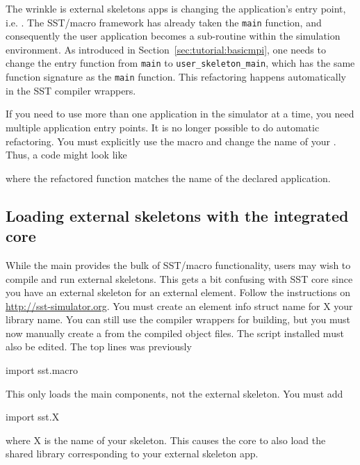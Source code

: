 The wrinkle is external skeletons apps is changing the application's entry point, i.e. .
The SST/macro framework has already taken the \texttt{main} function, and consequently the user application becomes a sub-routine within the simulation environment. As introduced in Section~\ref{sec:tutorial:basicmpi}, one needs to change the entry function from \texttt{main} to \texttt{user\_skeleton\_main}, which has the same function signature as the \texttt{main} function.  This refactoring happens automatically in the SST compiler wrappers. 

If you need to use more than one application in the simulator at a time, you need multiple application entry points.
It is no longer possible to do automatic refactoring.  You must explicitly use the macro 
and change the name of your .  Thus, a code might look like

\begin{CppCode}
sstmac_register_app(my_app);

int my_app_main(int argc, char** argv)
{
...
\end{CppCode}
where the refactored  function matches the name of the declared application.

\subsection{Loading external skeletons with the integrated core}\label{subsec:linkageCore}
While the main  provides the bulk of SST/macro functionality, 
users may wish to compile and run external skeletons.  This gets a bit confusing with SST core since you have an external skeleton for an external element.  Follow the instructions on \url{http://sst-simulator.org}. You must create an element info struct name  for X your library name.  You can still use the  compiler wrappers for building, but you must now manually create a  from the compiled object files.  The  script installed must also be edited.  The top lines was previously

\begin{ViFile}
import sst.macro
\end{ViFile}
This only loads the main components, not the external skeleton. You must add

\begin{ViFile}
import sst.X
\end{ViFile}
where X is the name of your skeleton. This causes the core to also load the shared library corresponding to your external skeleton app.

